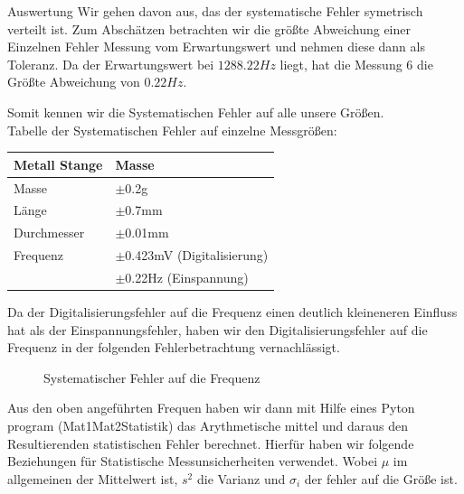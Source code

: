 \documentclass[twoside]{protokoll}
\begin{document}
\begin{aufgabe}{Auswertung}
Wir gehen davon aus, das der systematische Fehler symetrisch verteilt ist.
Zum Abschätzen betrachten wir die größte Abweichung einer Einzelnen Fehler Messung vom Erwartungswert und nehmen diese dann als Toleranz.
Da der Erwartungswert bei $1288.22 Hz$ liegt, hat die Messung 6 die Größte Abweichung von $0.22 Hz$.

Somit kennen wir die Systematischen Fehler auf alle unsere Größen.\\


Tabelle der Systematischen Fehler auf einzelne Messgrößen: 

\begin{table}[H]
    \centering
    \begin{tabularx}{0.8\textwidth}{X l} %
        \toprule
        \textbf{Metall Stange} & \textbf{Masse} \\
        \midrule
        Masse & $\pm$0.2g \\
        Länge & $\pm$0.7mm\\
        Durchmesser & $\pm$0.01mm \\
        Frequenz & $\pm$0.423mV (Digitalisierung)\\
        & $\pm$0.22Hz (Einspannung) \\
        \bottomrule
    \end{tabularx}
    \label{tab:mytable}
\end{table}

Da der Digitalisierungsfehler auf die Frequenz einen deutlich kleineneren Einfluss hat als der Einspannungsfehler, haben wir den Digitalisierungsfehler auf die Frequenz in der folgenden Fehlerbetrachtung vernachlässigt.

\begin{figure}[H]
  \centering
    \caption{Systematischer Fehler auf die Frequenz}
  \hfill
\end{figure}
\begin{figure}[H]
  \centering
  \hfill
\end{figure}
 
Aus den oben angeführten Frequen haben wir dann mit Hilfe eines Pyton program (Mat1Mat2Statistik) das Arythmetische mittel und daraus den Resultierenden statistischen Fehler berechnet. Hierfür haben wir folgende Beziehungen für Statistische Messunsicherheiten verwendet. Wobei $\mu$ im allgemeinen der Mittelwert ist, $s^2$ die Varianz und $\sigma_i$ der fehler auf die Größe ist.


\end{aufgabe}
\end{document}
